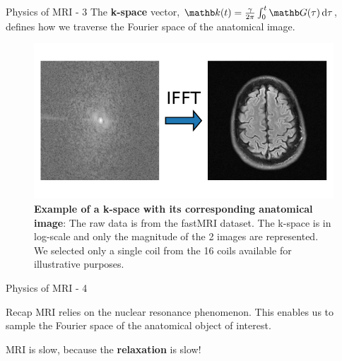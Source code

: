 \begin{frame}{Physics of MRI - 3}
    The \textbf{k-space} vector, $\kb(t) = \frac{\gamma}{2\pi} \int_0^t \Gb(\tau) \dif \tau$, defines how we traverse the Fourier space of the anatomical image.

    \begin{figure}
        \centering
        \includegraphics[height=0.4\textheight]{Figures/intro_figures/kspace_to_image.pdf}
        \caption{\label{fig:example-kspace}\textbf{Example of a k-space with its corresponding anatomical image}: The raw data is from the fastMRI dataset. The k-space is in log-scale and only the magnitude of the 2 images are represented. We selected only a single coil from the 16 coils available for illustrative purposes.}
    \end{figure}
\end{frame}

\begin{frame}{Physics of MRI - 4}
    \begin{block}{Recap}
        MRI relies on the nuclear resonance phenomenon. This enables us to sample the Fourier space of the anatomical object of interest.
    \end{block}
    \pause
    MRI is slow, because the \textbf{relaxation} is slow!
\end{frame}

